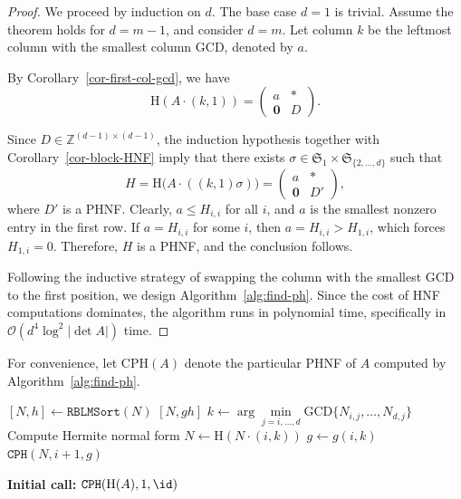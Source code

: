\documentclass[reqno, 12pt]{article}
\theoremstyle{mydefinition}
\theoremstyle{myremark}
\numberwithin{algorithm}{section}
\newcommand{\h}{{\mathrm{H}}}
\begin{document}
\begin{proof}
We proceed by induction on $d$. The base case $d=1$ is trivial. Assume the theorem holds for $d = m-1$, and consider $d = m$.
Let column $k$ be the leftmost column with the smallest column GCD, denoted by $a$.

By Corollary~\ref{cor-first-col-gcd}, we have
\[
\h(A \cdot (k,1)) = \begin{pmatrix}
a & * \\
\mathbf{0} & D
\end{pmatrix}.
\]

Since $D \in \mathbb{Z}^{(d-1) \times (d-1)}$, the induction hypothesis together with Corollary~\ref{cor-block-HNF} imply that there exists $\sigma \in \mathfrak{S}_{1} \times \mathfrak{S}_{\{2,\dots,d\}}$ such that
\[
H = \h\bigl(A \cdot ((k,1)\sigma)\bigr) = \begin{pmatrix}
a & * \\
\mathbf{0} & D'
\end{pmatrix},
\]
where $D'$ is a PHNF. Clearly, $a \le H_{i,i}$ for all $i$, and $a$ is the smallest nonzero entry in the first row. If $a = H_{i,i}$ for some $i$, then $a = H_{i,i} > H_{1,i}$, which forces $H_{1,i} = 0$. Therefore, $H$ is a PHNF, and the conclusion follows.

Following the inductive strategy of swapping the column with the smallest GCD to the first position, we design Algorithm~\ref{alg:find-ph}. Since the cost of HNF computations dominates, the algorithm runs in polynomial time, specifically in $\mathcal{O}(d^4 \log^2 |\det A|)$ time.
\end{proof}


For convenience, let $\mathrm{CPH}(A)$ denote the particular PHNF of $A$ computed by Algorithm~\ref{alg:find-ph}.

\begin{algorithm}[H]
\caption{Computing a Permuted Hermite Normal Form}
\label{alg:find-ph}
\begin{algorithmic}[1]
        \State $[N,h]\gets \texttt{RBLMSort}(N)$
        \State \Return $[N,gh]$
    \EndIf
    \State $k \gets \arg\min\limits_{j=i,\dots,d} \mathrm{GCD}\{N_{i,j}, \dots, N_{d,j}\}$ 
    \State Compute Hermite normal form $N \gets \h(N\cdot (i,k))$
    \State $g \gets g(i,k)$
    \State \Return $\texttt{CPH}(N, i+1, g)$ 
\EndProcedure

\Statex
\State \textbf{Initial call:} $\text{\texttt{CPH}}(\h(A), 1, \id)$
\end{algorithmic}
\end{algorithm}
\end{document}
